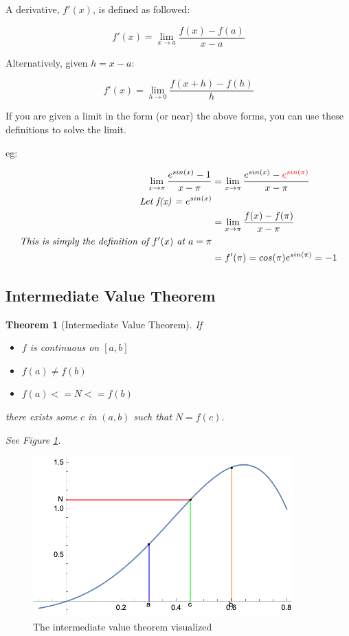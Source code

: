 \documentclass[12pt]{article}
\newtheorem{theorem}{Theorem}
\begin{document}
A derivative, $f'(x)$, is defined as followed:

$$f'(x) = \lim_{x\to a}\frac{f(x)-f(a)}{x-a}$$

Alternatively, given $h = x-a$:

$$f'(x) = \lim_{h\to 0} \frac{f(x+h)-f(h)}{h}$$

If you are given a limit in the form (or near) the above forms, you can use these definitions to solve the limit. 

eg: 

\begin{equation}
    \begin{split}
    \lim_{x\to \pi}\frac{e^{sin(x)} - 1}{x - \pi} &= \lim_{x\to \pi}\frac{e^{sin(x)} - \textcolor{red}{e^{sin(\pi)}}}{x - \pi}\\
    \textit{Let f(x) = $e^{sin(x)}$}\\
    &=\lim_{x\to \pi}\frac{f(x)-f(\pi)}{x - \pi}\\
    \textit{This is simply the definition of $f'(x)$ at $a=\pi$}\\
    &=f'(\pi) = cos(\pi)e^{sin(\pi)} = -1
    \end{split}
\end{equation}

\subsection{Intermediate Value Theorem}
\begin{theorem}[Intermediate Value Theorem]
    If
    \begin{itemize}
        \item $f$ is continuous on $[a,b]$
        \item $f(a) \neq f(b)$
        \item $f(a) <= N <= f(b)$
    \end{itemize}

    there exists some $c$ in $(a,b)$ such that $N = f(c)$.
    
    See Figure \ref{ivt}.
\end{theorem}
\begin{figure}[!ht]
    \centering
    \includegraphics[width=10.0cm]{misc/imvt.png}
    \caption{The intermediate value theorem visualized}
    \label{ivt}
\end{figure}
\end{document}
